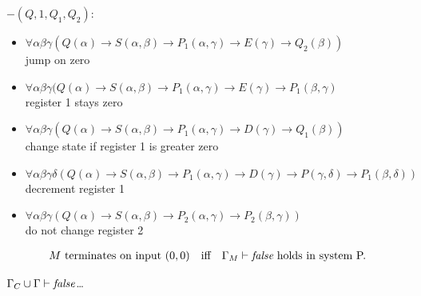 $-(Q,1,Q_1,Q_2):$
\begin{itemize}
\item $\forall\alpha\beta\gamma(Q(\alpha)\to S(\alpha,\beta)\to P_1(\alpha,\gamma)\to E(\gamma)\to Q_2(\beta))$\\jump on zero
\item $\forall\alpha\beta\gamma(Q(\alpha)\to S(\alpha,\beta)\to P_1(\alpha,\gamma)\to E(\gamma)\to P_1(\beta,\gamma)$\\register 1 stays zero
\item $\forall\alpha\beta\gamma(Q(\alpha)\to S(\alpha,\beta)\to P_1(\alpha,\gamma)\to D(\gamma)\to Q_1(\beta))$\\change state if register 1 is greater zero
\item $\forall\alpha\beta\gamma\delta(Q(\alpha)\to S(\alpha,\beta)\to P_1(\alpha,\gamma)\to D(\gamma) \to P(\gamma,\delta)\to P_1(\beta,\delta))$\\decrement register 1
\item $\forall\alpha\beta\gamma(Q(\alpha)\to S(\alpha,\beta)\to P_2(\alpha,\gamma)\to P_2(\beta,\gamma))$\\do not change register 2
\end{itemize}
\begin{lemma}
\begin{align*}
&\text{$M$ terminates on input $(0,0)$}&& \text{iff} &\text{$\Gamma_M\vdash\emph{false}$ holds in system P.}
\end{align*}
\end{lemma}
\begin{claim}
$\Gamma_C\cup\Gamma\vdash\emph{false}$\dots
\end{claim}
